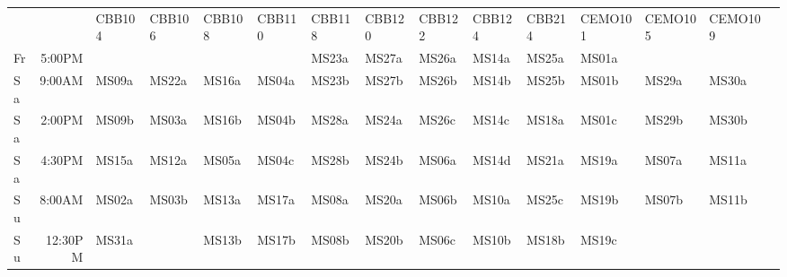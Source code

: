 \begin{sidewaystable}
\begin{small}
\begin{tabular}{lrlllllllllllll}
   &         & CBB104 & CBB106 & CBB108 & CBB110 & CBB118 & CBB120 & CBB122 & CBB124 & CBB214 & CEMO101 & CEMO105 & CEMO109 \\
\rowcolor{p1color!20}
Fr &  5:00PM &        &        &        &        & MS23a  & MS27a  & MS26a  & MS14a  & MS25a  & MS01a   &         &         \\
\rowcolor{p2color!30}
Sa &  9:00AM & MS09a  & MS22a  & MS16a  & MS04a  & MS23b  & MS27b  & MS26b  & MS14b  & MS25b  & MS01b   & MS29a   & MS30a   \\
\rowcolor{p2color!20}
Sa &  2:00PM & MS09b  & MS03a  & MS16b  & MS04b  & MS28a  & MS24a  & MS26c  & MS14c  & MS18a  & MS01c   & MS29b   & MS30b   \\
\rowcolor{p2color!10}
Sa &  4:30PM & MS15a  & MS12a  & MS05a  & MS04c  & MS28b  & MS24b  & MS06a  & MS14d  & MS21a  & MS19a   & MS07a   & MS11a   \\
\rowcolor{p3color!30}
Su &  8:00AM & MS02a  & MS03b  & MS13a  & MS17a  & MS08a  & MS20a  & MS06b  & MS10a  & MS25c  & MS19b   & MS07b   & MS11b   \\
\rowcolor{p3color!20}
Su & 12:30PM & MS31a  &        & MS13b  & MS17b  & MS08b  & MS20b  & MS06c  & MS10b  & MS18b  & MS19c   &         &         \\
\end{tabular}
\end{small}
\end{sidewaystable}
